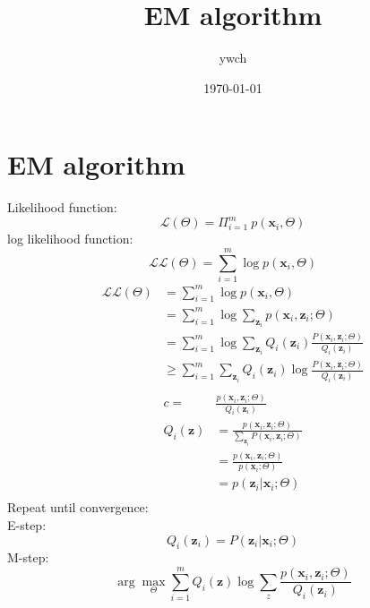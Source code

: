 \documentclass{article}
\title{EM algorithm}
\author {ywch}
\date{\today}
\begin{document}
\section{EM algorithm}
Likelihood function:
\begin{equation}
    \label{likelihood}
    \mathcal{L}(\Theta) = \Pi_{i=1}^m  \ p(\bm{x}_i,\Theta)
\end{equation}
log likelihood function:
\begin{equation}
    \label{log likelihood}
    \mathcal{L} \mathcal{L}(\Theta) = \sum_{i=1 }^m \log p(\bm{x}_i,\Theta)
\end{equation}
    \begin{align*}
    \mathcal{L} \mathcal{L}(\Theta) & = \sum_{i=1 }^m \log p(\bm{x}_i,\Theta)\\
    & = \sum_{i=1 }^m \log \sum_{\bm{z}_i} p (\bm{x}_i,\bm{z}_i;\Theta) \\
    & = \sum_{i=1 }^m \log \sum_{\bm{z}_i} Q_i(\bm{z}_i) \frac{P(\bm{x}_i,\bm{z}_i;\Theta)}{Q_i(\bm{z}_i)} \\
    & \geq \sum_{i=1 }^m  \sum_{\bm{z}_i} Q_i(\bm{z}_i)  \log   \frac{P(\bm{x}_i,\bm{z}_i;\Theta)}{Q_i(\bm{z}_i)} \\
    \end{align*}
\begin{align*}
     c = &  \frac{p(\bm{x}_i,\bm{z}_i;\Theta)}{Q_i(\bm{z}_i)}  \\
       Q_i(\bm{z}) & = \frac {p(\bm{x}_i,\bm{z}_i;\Theta)}{\sum_{\bm{z}_i}P(\bm{x}_i,\bm{z}_i;\Theta)} \\
        & = \frac {p(\bm{x}_i,\bm{z}_i;\Theta)} {p(\bm{x}_i;\Theta)} \\
      & = p(\bm{z}_i| \bm{x}_i;\Theta) \\
\end{align*}
Repeat until convergence:\\
E-step:
    $$Q_i(\bm{z}_i)=P(\bm{z}_i| \bm{x}_i;\Theta)$$
M-step:
    $$ \arg  \max_{\Theta}  \sum_{i=1 }^m  Q_i(\bm{z}) \log  \sum_{z} \frac{p(\bm{x}_i,\bm{z}_i;\Theta)}{Q_i(\bm{z}_i)} $$
\end{document}
